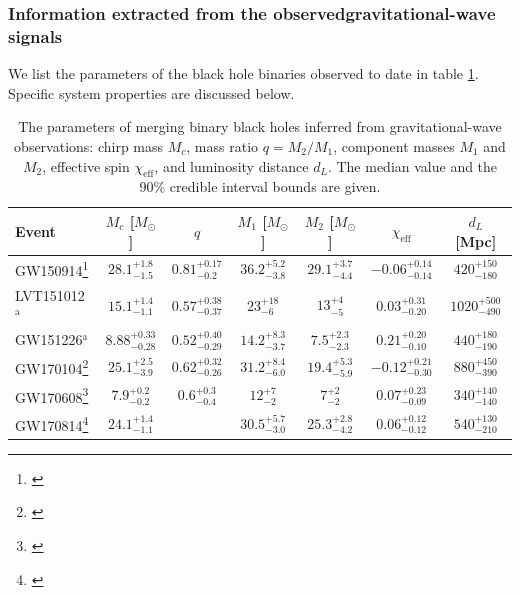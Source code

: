 \documentclass[iop,onecolumn]{revtex4}
\begin{document}
\subsubsection{Information extracted from the observedgravitational-wave signals}
We list the parameters of the black hole binaries observed to date in table \ref{table:BHmasses}. Specific system properties are discussed below.

\begin{table}
\begin{tabular}{lcccccc}
Event  & $M_c$ [$M_\odot$]  & $q$ & $M_1$ [$M_\odot$]  & $M_2$ [$M_\odot$]  & $\chi_\textrm{eff}$ & $d_L$ [Mpc] \\
\hline
GW150914\footnote{\citet{BBH:O1}} & $28.1^{+1.8}_{-1.5}$ & $0.81^{+0.17}_{-0.2}$ & $36.2^{+5.2}_{-3.8}$ & $29.1^{+3.7}_{-4.4}$ & $-0.06^{+0.14}_{-0.14}$ & $420^{+150}_{-180}$\\
LVT151012$^\mathrm{a}$ & $15.1^{+1.4}_{-1.1}$ &$0.57^{+0.38}_{-0.37}$ &$23^{+18}_{-6}$ &$13^{+4}_{-5}$ &$0.03^{+0.31}_{-0.20}$ &$1020^{+500}_{-490}$\\
GW151226$^\mathrm{a}$ & $8.88^{+0.33}_{-0.28}$ &$0.52^{+0.40}_{-0.29}$ &$14.2^{+8.3}_{-3.7}$ &$7.5^{+2.3}_{-2.3}$ &$0.21^{+0.20}_{-0.10}$ &$440^{+180}_{-190}$ \\
GW170104\footnote{\citet{GW170104}} & $25.1^{+2.5}_{-3.9}$ &$0.62^{+0.32}_{-0.26}$ &$31.2^{+8.4}_{-6.0}$ &$19.4^{+5.3}_{-5.9}$ &$-0.12^{+0.21}_{-0.30}$ &$880^{+450}_{-390}$\\
GW170608\footnote{\citet{GW170608}} & $7.9^{+0.2}_{-0.2}$ &$0.6^{+0.3}_{-0.4}$ &$12^{+7}_{-2}$ &$7^{+2}_{-2}$ &$0.07^{+0.23}_{-0.09}$ &$340^{+140}_{-140}$ \\
GW170814\footnote{\citet{GW170814}} & $24.1^{+1.4}_{-1.1}$ & &$30.5^{+5.7}_{-3.0}$ &$25.3^{+2.8}_{-4.2}$ &$0.06^{+0.12}_{-0.12}$ & $540^{+130}_{-210}$ \\
\hline
\end{tabular}
\caption{The parameters of merging binary black holes inferred from gravitational-wave observations: chirp mass $M_c$, mass ratio $q=M_2/M_1$, component masses $M_1$ and $M_2$, effective spin $\chi_\textrm{eff}$, and luminosity distance $d_L$.  The median value and the 90\% credible interval bounds are given.}\label{table:BHmasses}
\end{table}
\end{document}
